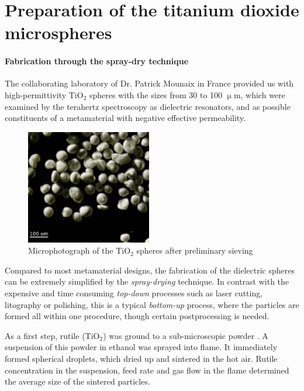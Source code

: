 
\section{Preparation of the titanium dioxide microspheres}
\paragraph{Fabrication through the spray-dry technique}%
The collaborating laboratory of Dr. Patrick Mounaix in France %
provided us with high-permittivity TiO$_{2}$ spheres with the sizes from 30 to 100 $\upmu$m, which were examined by the terahertz spectroscopy as dielectric resonators, and as possible constituents of a metamaterial with negative effective permeability.
\begin{figure}[ht] \caption{Microphotograph of the TiO$_{2}$ spheres after preliminary sieving} \label{fg_microphoto} \centering 
\includegraphics[height=5cm]{img/microscope_TiO2_particles.pdf}
\end{figure}

Compared to most metamaterial designs, the fabrication of the dielectric spheres can be extremely simplified by the \textit{spray-drying} technique. In contrast with the expensive and time consuming \textit{top-down} processes such as laser cutting, litography or polishing, this is a typical \textit{bottom-up} process, where the particles are formed all within one procedure, though certain postprocessing is needed. 

As a first step, rutile (TiO$_{2}$) was ground to a sub-microscopic powder \cite[pp. 91-93]{yahiaoui2011phd}. A suspension of this powder in ethanol was sprayed into flame. It immediately formed spherical droplets, which dried up and sintered in the hot air. Rutile concentration in the suspension, feed rate and gas flow in the flame determined the average size of the sintered particles.

